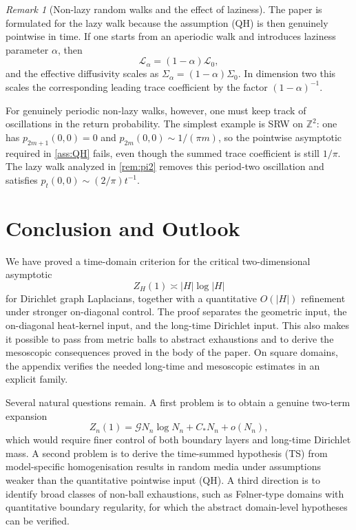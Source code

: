 \documentclass[reqno]{amsart}
\numberwithin{equation}{section}
\theoremstyle{definition}
\theoremstyle{remark}
\newtheorem{remark}[remark]{Remark}
\newcommand{\Cref}[1]{\autoref{#1}}
\newcommand{\cG}{\mathcal{G}}
\newcommand{\LL}{\mathcal{L}}
\begin{document}
\begin{remark}[Non-lazy random walks and the effect of laziness]\label{rem:non-lazy}
The paper is formulated for the lazy walk because the assumption (QH) is then genuinely pointwise in time. If one starts from an aperiodic walk and introduces laziness parameter $\alpha$, then
\[
\LL_{\alpha}=(1-\alpha)\LL_{0},
\]
and the effective diffusivity scales as $\Sigma_{\alpha}=(1-\alpha)\Sigma_{0}$. In dimension two this scales the corresponding leading trace coefficient by the factor $(1-\alpha)^{-1}$.

For genuinely periodic non-lazy walks, however, one must keep track of oscillations in the return probability. The simplest example is SRW on $\mathbb{Z}^2$: one has $p_{2m+1}(0,0)=0$ and $p_{2m}(0,0)\sim 1/(\pi m)$, so the pointwise asymptotic required in \Cref{ass:QH} fails, even though the summed trace coefficient is still $1/\pi$. The lazy walk analyzed in \Cref{rem:pi2} removes this period-two oscillation and satisfies $p_t(0,0)\sim (2/\pi)t^{-1}$.
\end{remark}

\section{Conclusion and Outlook}

We have proved a time-domain criterion for the critical two-dimensional asymptotic
\[
  Z_H(1)\asymp |H|\log|H|
\]
for Dirichlet graph Laplacians, together with a quantitative $O(|H|)$ refinement under stronger on-diagonal control. The proof separates the geometric input, the on-diagonal heat-kernel input, and the long-time Dirichlet input. This also makes it possible to pass from metric balls to abstract exhaustions and to derive the mesoscopic consequences proved in the body of the paper. On square domains, the appendix verifies the needed long-time and mesoscopic estimates in an explicit family.

Several natural questions remain. A first problem is to obtain a genuine two-term expansion
\[
  Z_n(1)=\cG N_n\log N_n + C_* N_n + o(N_n),
\]
which would require finer control of both boundary layers and long-time Dirichlet mass. A second problem is to derive the time-summed hypothesis \textup{(TS)} from model-specific homogenisation results in random media under assumptions weaker than the quantitative pointwise input \textup{(QH)}. A third direction is to identify broad classes of non-ball exhaustions, such as Følner-type domains with quantitative boundary regularity, for which the abstract domain-level hypotheses can be verified.
\end{document}
